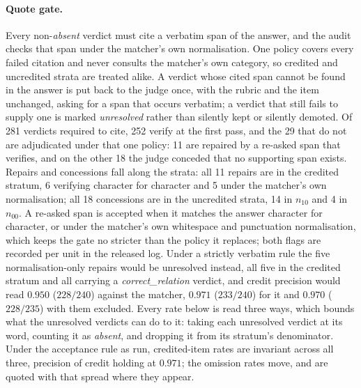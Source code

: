 \documentclass[10pt,twocolumn]{article}
\begin{document}
\paragraph{Quote gate.} Every non-\emph{absent} verdict must cite a verbatim span of the answer, and the audit checks that span under the matcher's own normalisation. One policy covers every failed citation and never consults the matcher's own category, so credited and uncredited strata are treated alike. A verdict whose cited span cannot be found in the answer is put back to the judge once, with the rubric and the item unchanged, asking for a span that occurs verbatim; a verdict that still fails to supply one is marked \emph{unresolved} rather than silently kept or silently demoted. Of 281 verdicts required to cite, 252 verify at the first pass, and the 29 that do not are adjudicated under that one policy: 11 are repaired by a re-asked span that verifies, and on the other 18 the judge conceded that no supporting span exists. Repairs and concessions fall along the strata: all 11 repairs are in the credited stratum, 6 verifying character for character and 5 under the matcher's own normalisation; all 18 concessions are in the uncredited strata, 14 in $n_{10}$ and 4 in $n_{00}$. A re-asked span is accepted when it matches the answer character for character, or under the matcher's own whitespace and punctuation normalisation, which keeps the gate no stricter than the policy it replaces; both flags are recorded per unit in the released log. Under a strictly verbatim rule the five normalisation-only repairs would be unresolved instead, all five in the credited stratum and all carrying a \emph{correct\_relation} verdict, and credit precision would read $0.950$ ($228/240$) against the matcher, $0.971$ ($233/240$) for it and $0.970$ ($228/235$) with them excluded. Every rate below is read three ways, which bounds what the unresolved verdicts can do to it: taking each unresolved verdict at its word, counting it as \emph{absent}, and dropping it from its stratum's denominator. Under the acceptance rule as run, credited-item rates are invariant across all three, precision of credit holding at $0.971$; the omission rates move, and are quoted with that spread where they appear.
\end{document}
